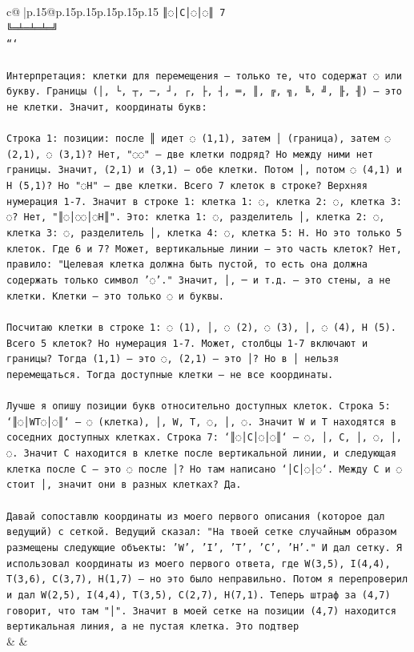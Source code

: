 \documentclass{article}
\begin{document}
{\begin{supertabular}{c@{$\;$}|p{.15\linewidth}@{}p{.15\linewidth}p{.15\linewidth}p{.15\linewidth}p{.15\linewidth}p{.15\linewidth}}
{{{\texttt{║◌│C│◌│◌║ 7} \\
\texttt{╚═╧═╧═╧═╝} \\
\texttt{```} \\
\\ 
\texttt{Интерпретация: клетки для перемещения — только те, что содержат ◌ или букву. Границы (│, └, ┬, ─, ┘, ┌, ├, ┤, ═, ║, ╔, ╗, ╚, ╝, ╟, ╢) — это не клетки. Значит, координаты букв:} \\
\\ 
\texttt{Строка 1: позиции: после ║ идет ◌ (1,1), затем │ (граница), затем ◌ (2,1), ◌ (3,1)? Нет, "◌◌" — две клетки подряд? Но между ними нет границы. Значит, (2,1) и (3,1) — обе клетки. Потом │, потом ◌ (4,1) и H (5,1)? Но "◌H" — две клетки. Всего 7 клеток в строке? Верхняя нумерация 1{-}7. Значит в строке 1: клетка 1: ◌, клетка 2: ◌, клетка 3: ◌? Нет, "║◌│◌◌│◌H║". Это: клетка 1: ◌, разделитель │, клетка 2: ◌, клетка 3: ◌, разделитель │, клетка 4: ◌, клетка 5: H. Но это только 5 клеток. Где 6 и 7? Может, вертикальные линии — это часть клеток? Нет, правило: "Целевая клетка должна быть пустой, то есть она должна содержать только символ '◌'." Значит, │, ─ и т.д. — это стены, а не клетки. Клетки — это только ◌ и буквы.} \\
\\ 
\texttt{Посчитаю клетки в строке 1: ◌ (1), │, ◌ (2), ◌ (3), │, ◌ (4), H (5). Всего 5 клеток? Но нумерация 1{-}7. Может, столбцы 1{-}7 включают и границы? Тогда (1,1) — это ◌, (2,1) — это │? Но в │ нельзя перемещаться. Тогда доступные клетки — не все координаты.} \\
\\ 
\texttt{Лучше я опишу позиции букв относительно доступных клеток. Строка 5: `║◌│WT◌│◌║` — ◌ (клетка), │, W, T, ◌, │, ◌. Значит W и T находятся в соседних доступных клетках. Строка 7: `║◌│C│◌│◌║` — ◌, │, C, │, ◌, │, ◌. Значит C находится в клетке после вертикальной линии, и следующая клетка после C — это ◌ после │? Но там написано `│C│◌│◌`. Между C и ◌ стоит │, значит они в разных клетках? Да.} \\
\\ 
\texttt{Давай сопоставлю координаты из моего первого описания (которое дал ведущий) с сеткой. Ведущий сказал: "На твоей сетке случайным образом размещены следующие объекты: 'W', 'I', 'T', 'C', 'H'." И дал сетку. Я использовал координаты из моего первого ответа, где W(3,5), I(4,4), T(3,6), C(3,7), H(1,7) — но это было неправильно. Потом я перепроверил и дал W(2,5), I(4,4), T(3,5), C(2,7), H(7,1). Теперь штраф за (4,7) говорит, что там "│". Значит в моей сетке на позиции (4,7) находится вертикальная линия, а не пустая клетка. Это подтвер} \\
            }
        }
    }
    & & \\ \\


\end{supertabular}}
\end{document}
